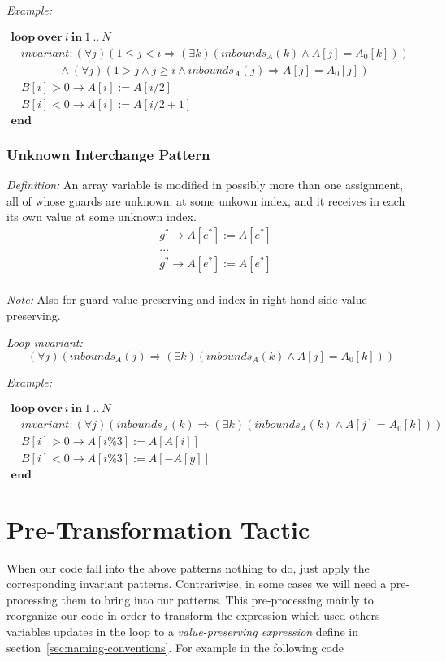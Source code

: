 \documentclass[a4paper,10pt]{article}
\newcommand{\KWloop}{\ensuremath{\mathrm{\textbf{loop}}~}}
\newcommand{\KWend}{\ensuremath{\mathrm{\textbf{end}}~}}
\newcommand{\KWover}{\ensuremath{\mathrm{\textbf{over}}~}}
\newcommand{\KWin}{\ensuremath{~\mathrm{\textbf{in}}~}}
\newcommand{\impl}{\ensuremath{\Longrightarrow}}
\newcommand{\inbounds}[2]{\ensuremath{\mathit{inbounds}_{#1}(#2)}\xspace}
\newcommand{\loopinvariant}{\noindent\textit{Loop invariant:}\xspace}
\newcommand{\patterndef}{\noindent\textit{Definition:}\xspace}
\newcommand{\patternexample}{\noindent\textit{Example:}\xspace}
\newcommand{\patternnote}{\noindent\textit{Note:}\xspace}
\begin{document}
\bigskip
\patternexample

\medskip
$\begin{array}{l}
  \KWloop \KWover i \KWin 1~..~N \\
  ~~~~ \textit{invariant}: (\forall j)(1 \leq j < i \impl (\exists k)(\inbounds{A}{k} \land A[j] = A_0[k]))\\
  ~~~~~~~~~~~~~~~~~~~ \land (\forall j)(1 > j \land j \geq i \land \inbounds{A}{j} \impl A[j] = A_0[j])\\
  ~~~~ B[i] > 0 \rightarrow A[i] := A[i/2]\\
  ~~~~ B[i] < 0 \rightarrow A[i] := A[i/2+1]\\
  \KWend
\end{array}$

\subsubsection*{Unknown Interchange Pattern}

\patterndef An array variable is modified in possibly more than one assignment,
all of whose guards are unknown, at some unkown index, and it receives in each
its own value at some unknown index.
%
\begin{eqnarray*}
&g^? \rightarrow A[e^?] := A[e^?]\\
&...\\
&g^? \rightarrow A[e^?] := A[e^?]\\
\end{eqnarray*}

\patternnote Also for guard value-preserving and index in right-hand-side value-preserving.

\medskip
\loopinvariant
%
$$(\forall j)(\inbounds{A}{j} \impl (\exists k)(\inbounds{A}{k} \land A[j] = A_0[k])) $$

\bigskip
\patternexample

\medskip
$\begin{array}{l}
  \KWloop \KWover i \KWin 1~..~N \\
  ~~~~ \textit{invariant}: (\forall j)(\inbounds{A}{k} \impl (\exists k)(\inbounds{A}{k} \land A[j] = A_0[k]))\\
  ~~~~ B[i] > 0 \rightarrow A[i\%3] := A[A[i]]\\
  ~~~~ B[i] < 0 \rightarrow A[i\%3] := A[-A[y]]\\
  \KWend
\end{array}$

\section{Pre-Transformation Tactic}
When our code fall into the above patterns nothing to do, just apply the corresponding invariant patterns. 
Contrariwise, in some cases we will need a pre-processing them to bring into our patterns. 
This pre-processing mainly to reorganize our code in order to transform the expression 
which used others variables updates in the loop to a \textit{value-preserving expression}  
define in section~\ref{sec:naming-conventions}. For example in the following code 
\end{document}
